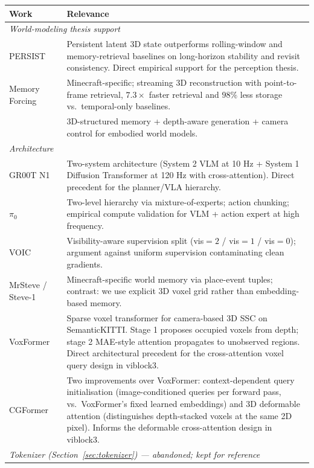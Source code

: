 \documentclass[11pt,a4paper]{article}
\begin{document}
\begin{center}
\begin{tabular}{lp{9cm}}
\toprule
Work & Relevance \\
\midrule
\multicolumn{2}{l}{\textit{World-modeling thesis support}} \\
PERSIST~\cite{persist} & Persistent latent 3D state outperforms rolling-window and memory-retrieval baselines on long-horizon stability and revisit consistency. Direct empirical support for the perception thesis. \\
Memory Forcing~\cite{memforcing} & Minecraft-specific; streaming 3D reconstruction with point-to-frame retrieval, $7.3\times$ faster retrieval and $98\%$ less storage vs.\ temporal-only baselines. \\
\citet{zhou3d} & 3D-structured memory + depth-aware generation + camera control for embodied world models. \\
\midrule
\multicolumn{2}{l}{\textit{Architecture}} \\
GR00T N1~\cite{groot} & Two-system architecture (System 2 VLM at 10 Hz + System 1 Diffusion Transformer at 120 Hz with cross-attention). Direct precedent for the planner/VLA hierarchy. \\
$\pi_0$~\cite{pi0} & Two-level hierarchy via mixture-of-experts; action chunking; empirical compute validation for VLM + action expert at high frequency. \\
VOIC~\cite{voic} & Visibility-aware supervision split (vis$=2$ / vis$=1$ / vis$=0$); argument against uniform supervision contaminating clean gradients. \\
MrSteve / Steve-1~\cite{mrsteve} & Minecraft-specific world memory via place-event tuples; contrast: we use explicit 3D voxel grid rather than embedding-based memory. \\
VoxFormer~\cite{voxformer} & Sparse voxel transformer for camera-based 3D SSC on SemanticKITTI. Stage 1 proposes occupied voxels from depth; stage 2 MAE-style attention propagates to unobserved regions. Direct architectural precedent for the cross-attention voxel query design in viblock3. \\
CGFormer~\cite{cgformer} & Two improvements over VoxFormer: context-dependent query initialisation (image-conditioned queries per forward pass, vs.\ VoxFormer's fixed learned embeddings) and 3D deformable attention (distinguishes depth-stacked voxels at the same 2D pixel). Informs the deformable cross-attention design in viblock3. \\
\midrule
\multicolumn{2}{l}{\textit{Tokenizer (Section~\ref{sec:tokenizer}) --- abandoned; kept for reference}} \\

\end{tabular}
\end{center}
\end{document}
